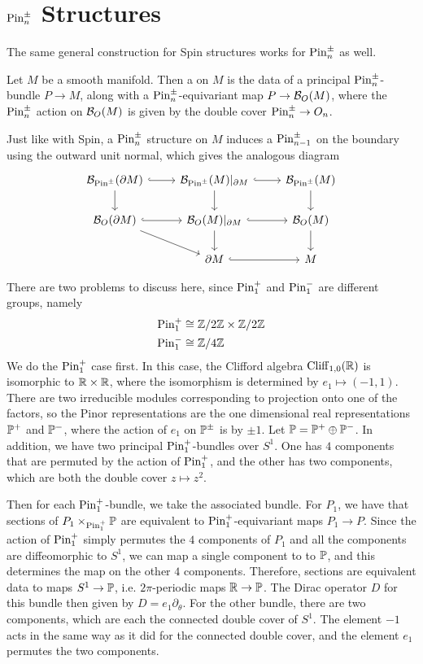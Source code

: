 %
\section{$\Pin^\pm_n$ Structures}
%
The same general construction for Spin structures works for $\Pin^\pm_n$ as well.
%
\begin{defn}
Let $M$ be a smooth manifold. Then a  on $M$ is the
data of a principal $\Pin_n^\pm$-bundle $P \to M$, along with a
$\Pin^\pm_n$-equivariant map $P \to \B_O(M)$, where the $\Pin^\pm_n$ action on
$\B_O(M)$ is given by the double cover $\Pin^\pm_n \to O_n$.
\end{defn}
%
Just like with Spin, a $\Pin^\pm_n$ structure on $M$ induces a $\Pin^\pm_{n-1}$
on the boundary using the outward unit normal, which gives the analogous diagram
\[\begin{tikzcd}
\B_{\Pin^\pm}(\partial M) \ar[d]\ar[r, hookrightarrow] & \B_{\Pin^\pm}(M)\vert_{\partial M}
\ar[d]\ar[r, hookrightarrow] & \B_{\Pin^\pm}(M) \ar[d]\\
\B_O(\partial M) \ar[dr]\ar[r, hookrightarrow] & \B_O(M)\vert_{\partial M}
\ar[d]\ar[r, hookrightarrow] & \B_O(M) \ar[d]\\
& \partial M \ar[r, hookrightarrow]& M
\end{tikzcd}\]
%
\begin{exmp}
There are two problems to discuss here, since $\Pin_1^+$ and $\Pin_1^-$ are
different groups, namely
\begin{align*}
\Pin_1^+ &\cong \Z/2\Z \times \Z / 2\Z \\
\Pin_1^- &\cong \Z/4\Z
\end{align*}
We do the $\Pin_1^+$ case first. In this case, the Clifford algebra
$\Cliff_{1,0}(\R)$ is isomorphic to $\R \times \R$, where the isomorphism is
determined by $e_1 \mapsto (-1,1)$. There are two irreducible modules corresponding
to projection onto one of the factors, so the Pinor representations are the one
dimensional real representations $\P^+$ and $\P^-$, where the action of $e_1$ on
$\P^\pm$ is by $\pm 1$. Let $\P = \P^+ \oplus \P^-$. In addition, we have two
principal $\Pin^+_1$-bundles over $S^1$. One has $4$ components that are permuted
by the action of $\Pin_1^+$, and the other has two components, which
are both the double cover $z \mapsto z^2$.

Then for each $\Pin_1^+$-bundle,
we take the associated bundle. For $P_1$, we have that sections of
$P_1 \times_{\Pin_1^+} \P$ are equivalent to $\Pin_1^+$-equivariant maps
$P_1 \to P$. Since the action of $\Pin_1^+$ simply permutes the $4$ components
of $P_1$ and all the components are diffeomorphic to $S^1$, we can map
a single component to to $\P$, and this determines the map on the other $4$
components. Therefore, sections are equivalent data to maps $S^1 \to \P$, i.e.
$2\pi$-periodic maps $\R \to \P$. The Dirac operator $D$ for this bundle then
given by $D = e_1\partial_\theta$. For the other bundle, there are two components,
which are each the connected double cover of $S^1$. The element $-1$ acts in the same
way as it did for the connected double cover, and the element $e_1$ permutes
the two components.
\end{exmp}
%